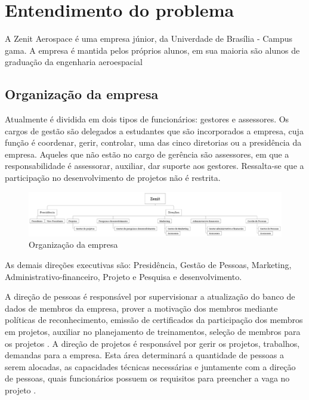 \section{Entendimento do problema}
A Zenit Aerospace é uma empresa júnior, da Univerdade de Brasília - Campus gama. A empresa é mantida pelos próprios alunos, em sua maioria são alunos de graduação da engenharia aeroespacial

\subsection{Organização da empresa}
Atualmente é dividida em dois tipos de funcionários: gestores e assessores. Os cargos de gestão são delegados a estudantes que são incorporados a empresa, cuja função é coordenar, gerir, controlar, uma das cinco diretorias ou a presidência da empresa. Aqueles que não estão no cargo de gerência são assessores, em que a responsabilidade é assessorar, auxiliar, dar suporte aos gestores. Ressalta-se que a participação no desenvolvimento de projetos não é restrita.

\begin{figure}[H]
    \centering
    \label{organizacaoZenit}
    \includegraphics[keepaspectratio=true,scale=0.3]{figuras/zenitOrganograma.eps}
    \caption[Organização da empresa]{Organização da empresa}
\end{figure}

As demais direções executivas são: Presidência, Gestão de Pessoas, Marketing, Administrativo-financeiro, Projeto e Pesquisa e desenvolvimento. 

A direção de pessoas é responsável por supervisionar a atualização do banco de dados de membros da empresa, prover a motivação dos membros mediante políticas de reconhecimento, emissão de certificados da participação dos membros em projetos, auxiliar no planejamento de treinamentos, seleção de membros para os projetos \cite{regimentoInternoZenit}.
A direção de projetos é responsável por gerir os projetos, trabalhos, demandas para a empresa. Esta área determinará a quantidade de pessoas a serem alocadas, as capacidades técnicas necessárias e juntamente com a direção de pessoas, quais funcionários possuem os requisitos para preencher a vaga no projeto \cite{regimentoInternoZenit}.

